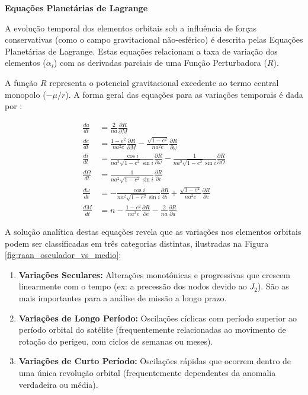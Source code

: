 \vspace{0.5cm}
\noindent \textbf{Equações Planetárias de Lagrange}

A evolução temporal dos elementos orbitais sob a influência de forças conservativas (como o campo gravitacional não-esférico) é descrita pelas Equações Planetárias de Lagrange. Estas equações relacionam a taxa de variação dos elementos ($\dot{\alpha}_i$) com as derivadas parciais de uma Função Perturbadora ($R$).

A função $R$ representa o potencial gravitacional excedente ao termo central monopolo ($-\mu/r$). A forma geral das equações para as variações temporais é dada por \cite{Vallado2013, Kaula1966}:

\begin{equation}
    \begin{aligned}
        \frac{da}{dt} &= \frac{2}{na} \frac{\partial R}{\partial M} \\
        \frac{de}{dt} &= \frac{1-e^2}{na^2e} \frac{\partial R}{\partial M} - \frac{\sqrt{1-e^2}}{na^2e} \frac{\partial R}{\partial \omega} \\
        \frac{di}{dt} &= \frac{\cos i}{na^2\sqrt{1-e^2}\sin i} \frac{\partial R}{\partial \omega} - \frac{1}{na^2\sqrt{1-e^2}\sin i} \frac{\partial R}{\partial \Omega} \\
        \frac{d\Omega}{dt} &= \frac{1}{na^2\sqrt{1-e^2}\sin i} \frac{\partial R}{\partial i} \\
        \frac{d\omega}{dt} &= -\frac{\cos i}{na^2\sqrt{1-e^2}\sin i} \frac{\partial R}{\partial i} + \frac{\sqrt{1-e^2}}{na^2e} \frac{\partial R}{\partial e} \\
        \frac{dM}{dt} &= n - \frac{1-e^2}{na^2e} \frac{\partial R}{\partial e} - \frac{2}{na} \frac{\partial R}{\partial a}
    \end{aligned}
    \label{eq:lagrange_planetary}
\end{equation}

A solução analítica destas equações revela que as variações nos elementos orbitais podem ser classificadas em três categorias distintas, ilustradas na Figura \ref{fig:raan_osculador_vs_medio}:

\begin{enumerate}
    \item \textbf{Variações Seculares:} Alterações monotônicas e progressivas que crescem linearmente com o tempo (ex: a precessão dos nodos devido ao $J_2$). São as mais importantes para a análise de missão a longo prazo.
    \item \textbf{Variações de Longo Período:} Oscilações cíclicas com período superior ao período orbital do satélite (frequentemente relacionadas ao movimento de rotação do perigeu, com ciclos de semanas ou meses).
    \item \textbf{Variações de Curto Período:} Oscilações rápidas que ocorrem dentro de uma única revolução orbital (frequentemente dependentes da anomalia verdadeira ou média).
\end{enumerate}

